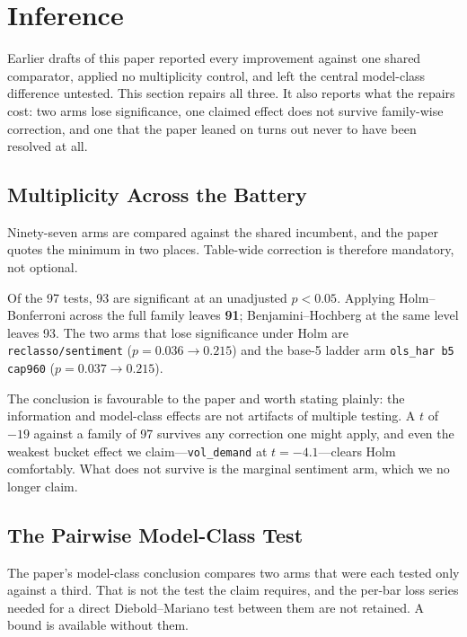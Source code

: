 \section{Inference}
\label{sec:inference}

Earlier drafts of this paper reported every improvement against one shared
comparator, applied no multiplicity control, and left the central model-class
difference untested. This section repairs all three. It also reports what the
repairs cost: two arms lose significance, one claimed effect does not survive
family-wise correction, and one that the paper leaned on turns out never to
have been resolved at all.

\subsection{Multiplicity Across the Battery}
\label{sec:multiplicity_results}

Ninety-seven arms are compared against the shared incumbent, and the paper
quotes the minimum in two places. Table-wide correction is therefore
mandatory, not optional.

Of the 97 tests, 93 are significant at an unadjusted $p < 0.05$. Applying
Holm--Bonferroni across the full family leaves \textbf{91}; Benjamini--Hochberg
at the same level leaves 93. The two arms that lose significance under Holm are
\texttt{reclasso/sentiment} ($p = 0.036 \to 0.215$) and the base-5 ladder arm
\texttt{ols\_har b5 cap960} ($p = 0.037 \to 0.215$).

The conclusion is favourable to the paper and worth stating plainly: the
information and model-class effects are not artifacts of multiple testing. A
$t$ of $-19$ against a family of 97 survives any correction one might apply,
and even the weakest bucket effect we claim---\texttt{vol\_demand} at
$t = -4.1$---clears Holm comfortably. What does not survive is the marginal
sentiment arm, which we no longer claim.

\subsection{The Pairwise Model-Class Test}
\label{sec:pairwise}

The paper's model-class conclusion compares two arms that were each tested
only against a third. That is not the test the claim requires, and the
per-bar loss series needed for a direct Diebold--Mariano test between them are
not retained. A bound is available without them.


